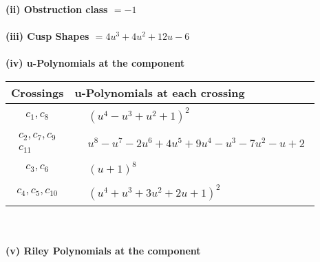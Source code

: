 \documentclass[1p]{elsarticle_modified}
\theoremstyle{definition}
\begin{document}
\flushleft \textbf{(ii) Obstruction class $= -1$}\\~\\
\flushleft \textbf{(iii) Cusp Shapes $= 4 u^3+4 u^2+12 u-6$}\\~\\
\newpage\renewcommand{\arraystretch}{1}
\flushleft \textbf{(iv) u-Polynomials at the component}\newline \\
\begin{tabular}{m{50pt}|m{274pt}}
Crossings & \hspace{64pt}u-Polynomials at each crossing \\
\hline $$\begin{aligned}c_{1},c_{8}\end{aligned}$$&$\begin{aligned}
&(u^4- u^3+u^2+1)^2
\end{aligned}$\\
\hline $$\begin{aligned}c_{2},c_{7},c_{9}\\c_{11}\end{aligned}$$&$\begin{aligned}
&u^8- u^7-2 u^6+4 u^5+9 u^4- u^3-7 u^2- u+2
\end{aligned}$\\
\hline $$\begin{aligned}c_{3},c_{6}\end{aligned}$$&$\begin{aligned}
&(u+1)^8
\end{aligned}$\\
\hline $$\begin{aligned}c_{4},c_{5},c_{10}\end{aligned}$$&$\begin{aligned}
&(u^4+u^3+3 u^2+2 u+1)^2
\end{aligned}$\\
\hline
\end{tabular}\\~\\
\newpage\renewcommand{\arraystretch}{1}
\flushleft \textbf{(v) Riley Polynomials at the component}\newline \\
\end{document}
